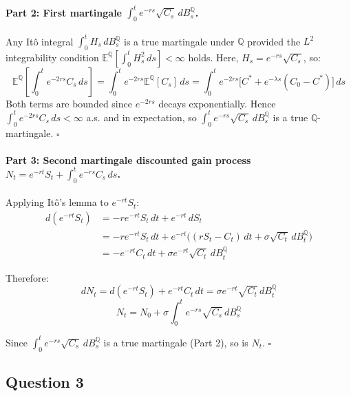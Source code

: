 \documentclass[12pt,a4paper]{article}
\begin{document}
\paragraph{Part 2: First martingale $\int_0^t e^{-rs}\sqrt{C_s}\,dB^{\mathbb{Q}}_s$.}
Any Itô integral $\int_0^t H_s\,dB^{\mathbb{Q}}_s$ is a true martingale under $\mathbb{Q}$ provided the $L^2$ integrability condition $\mathbb{E}^{\mathbb{Q}}\left[\int_0^t H_s^2\,ds\right] < \infty$ holds. Here, $H_s = e^{-rs}\sqrt{C_s}$, so:
\begin{equation*}
    \mathbb{E}^{\mathbb{Q}}\!\left[\int_0^t e^{-2rs} C_s\,ds\right] = \int_0^t e^{-2rs} \mathbb{E}^{\mathbb{Q}}[C_s]\,ds = \int_0^t e^{-2rs}\big[C^* + e^{-\lambda s}(C_0 - C^*)\big]\,ds
\end{equation*}
Both terms are bounded since $e^{-2rs}$ decays exponentially. Hence $\int_0^t e^{-2rs}C_s\,ds < \infty$ a.s. and in expectation, so $\int_0^t e^{-rs}\sqrt{C_s}\,dB^{\mathbb{Q}}_s$ is a true $\mathbb{Q}$-martingale. $\square$

\paragraph{Part 3: Second martingale  discounted gain process $N_t = e^{-rt}S_t + \int_0^t e^{-rs}C_s\,ds$.}
Applying Itô's lemma to $e^{-rt} S_t$:
\begin{align*}
    d(e^{-rt} S_t) &= -r e^{-rt} S_t\,dt + e^{-rt}\,dS_t \\
    &= -r e^{-rt} S_t\,dt + e^{-rt} \big((rS_t - C_t)\,dt + \sigma \sqrt{C_t}\,dB^{\mathbb{Q}}_t\big) \\
    &= -e^{-rt} C_t\,dt + \sigma e^{-rt} \sqrt{C_t}\,dB^{\mathbb{Q}}_t
\end{align*}

Therefore:
\begin{equation*}
    dN_t = d(e^{-rt} S_t) + e^{-rt} C_t\,dt = \sigma e^{-rt} \sqrt{C_t}\,dB^{\mathbb{Q}}_t
\end{equation*}
\begin{equation*}
    N_t = N_0 + \sigma \int_0^t e^{-rs}\sqrt{C_s}\,dB^{\mathbb{Q}}_s
\end{equation*}

Since $\int_0^t e^{-rs}\sqrt{C_s}\,dB^{\mathbb{Q}}_s$ is a true martingale (Part 2), so is $N_t$. $\square$

\subsection*{Question 3}
\end{document}
